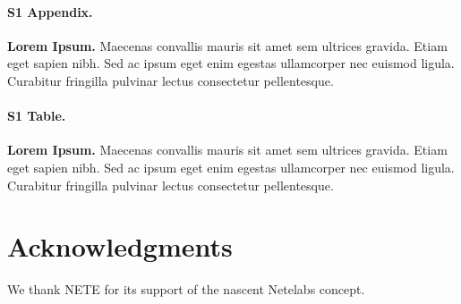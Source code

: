 \documentclass[10pt,letterpaper]{article}
\begin{document}
\paragraph*{S1 Appendix.}
\label{S1_Appendix}
{\bf Lorem Ipsum.} Maecenas convallis mauris sit amet sem ultrices gravida. Etiam eget sapien nibh. Sed ac ipsum eget enim egestas ullamcorper nec euismod ligula. Curabitur fringilla pulvinar lectus consectetur pellentesque.

\paragraph*{S1 Table.}
\label{S1_Table}
{\bf Lorem Ipsum.} Maecenas convallis mauris sit amet sem ultrices gravida. Etiam eget sapien nibh. Sed ac ipsum eget enim egestas ullamcorper nec euismod ligula. Curabitur fringilla pulvinar lectus consectetur pellentesque.

\section*{Acknowledgments} We thank NETE for its support of the nascent Netelabs concept.

\nolinenumbers
 
\end{document}
